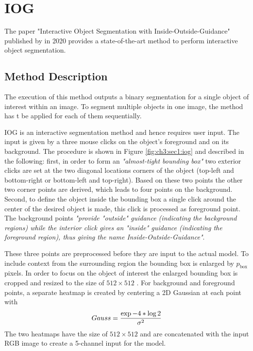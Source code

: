 
\section{IOG}\label{ord:ch3:sec1}

The paper "Interactive Object Segmentation with Inside-Outside-Guidance"\cite{Zha20-IOG} published by \citeauthor{Zha20-IOG} \etal in 2020 provides a state-of-the-art method to perform interactive object segmentation.

\subsection{Method Description}\label{ord:ch3:sec1:subsec1}
The execution of this method outputs a binary segmentation for a single object of interest within an image. 
To segment multiple objects in one image, the method has t be applied for each of them sequentially.

IOG is an interactive segmentation method and hence requires user input. 
The input is given by a three mouse clicks on the object's foreground and on its background.
The procedure is shown in Figure \ref{fig:ch3:sec1:iog} and described in the following:
first, in order to form an \emph{"almost-tight bounding box"}\cite[p. 12235]{Zha20-IOG} two exterior clicks are set at the two diagonal locations corners of the object (top-left and bottom-right or bottom-left and top-right).
Based on these two points the other two corner points are derived, which leads to four points on the background. 
Second, to define the object inside the bounding box a single click around the center of the desired object is made, this click is processed as foreground point. 
The background points \emph{"provide "outside" guidance (indicating the background regions) while the interior click gives an "inside" guidance (indicating the foreground region), thus giving the name \textit{Inside-Outside-Guidance}"}\cite[p. 12235]{Zha20-IOG}.

These three points are preprocessed before they are input to the actual model. To include context from the surrounding region the bounding box is enlarged by $p_{\text{box}}$ pixels. 
In order to focus on the object of interest the enlarged bounding box is cropped and resized to the size of $512 \times 512$ . 
For background and foreground points, a separate heatmap is created by centering a 2D Gaussian at each point with
\begin{equation} \label{equ:gauss}
	\centering
	Gauss = \frac{\exp{-4 * \log 2 }}{\sigma^{2}}
\end{equation}
The two heatmaps have the size of $512 \times 512$  and are concatenated with the input RGB image to create a 5-channel input for the model. 

